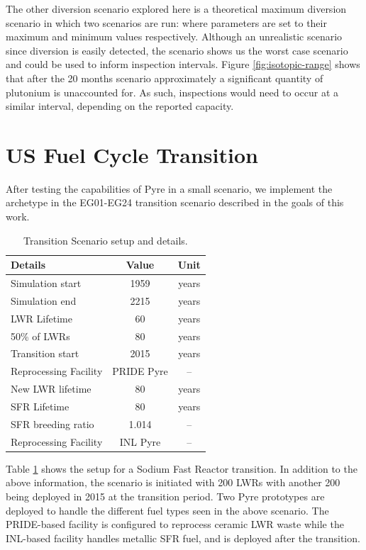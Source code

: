 The other diversion scenario explored here is a theoretical maximum diversion scenario in which two scenarios are run: where parameters are set to their maximum and minimum values
respectively. Although an unrealistic scenario since diversion is easily detected, the scenario shows us the worst case scenario and could be used to inform inspection intervals.
Figure \ref{fig:isotopic-range} shows that after the 20 months scenario approximately a significant quantity of plutonium is unaccounted for. As such, inspections would need to occur
at a similar interval, depending on the reported capacity.

\section{US Fuel Cycle Transition}

After testing the capabilities of Pyre in a small scenario, we implement the archetype in the EG01-EG24 transition scenario described in the goals of this work. 

\begin{table}[h]
	\centering
	\begin{tabularx}{0.5\linewidth}{lcc}
		\hline
		\textbf{Details} & \textbf{Value} & \textbf{Unit} \\
		\hline \hline
		Simulation start & 1959 & years \\ \hline
		Simulation end & 2215 & years \\ \hline
		LWR Lifetime & 60 & years \\ 
		50\% of LWRs & 80 & years \\ \hline
		Transition start & 2015 & years \\ \hline
		Reprocessing Facility & PRIDE Pyre & -- \\ \hline
		New LWR lifetime & 80 & years \\ \hline
		SFR Lifetime & 80 & years \\ \hline
		SFR breeding ratio & 1.014 & -- \\ \hline
		Reprocessing Facility & INL Pyre & -- \\ \hline
	\end{tabularx}
	\caption {Transition Scenario setup and details.}
	\label {tab:setup}
\end{table}

Table \ref{tab:setup} shows the setup for a Sodium Fast Reactor transition. In addition to the above information, the scenario is initiated with 200 LWRs with another 200 being deployed
in 2015 at the transition period. Two Pyre prototypes are deployed to handle the different fuel types seen in the above scenario. The PRIDE-based facility is configured to reprocess ceramic
LWR waste while the INL-based facility handles metallic SFR fuel, and is deployed after the transition. 

